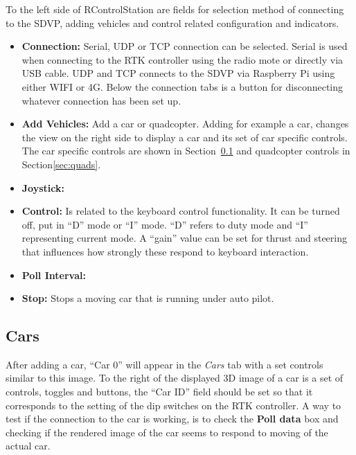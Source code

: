 \documentclass[12pt]{article} %
\begin{document}
\begin{minipage}{0.2\textwidth}
\end{minipage}
\begin{minipage}{0.7\textwidth}
  To the left side of RControlStation are fields for selection method of connecting to the
  SDVP, adding vehicles and control related configuration and indicators.  
  \begin{itemize}
  \item {\bf Connection:} Serial, UDP or TCP connection can be
    selected. Serial is used when connecting to the RTK controller
    using the radio mote or directly via USB cable. UDP and TCP
    connects to the SDVP via Raspberry Pi using either WIFI or 4G.
    Below the connection tabs is a button for disconnecting whatever
    connection has been set up. 
  \item {\bf Add Vehicles:} Add a car or quadcopter. Adding for
    example a car, changes the view on the right side to display a car
    and its set of car specific controls. The car specific controls are
    shown in Section~\ref{sec:cars} and quadcopter controls in Section\ref{sec:quads}.
  \item {\bf Joystick:} 
  \item {\bf Control:} Is related to the keyboard control
    functionality. It can be turned off, put in ``D'' mode or ``I''
    mode. ``D'' refers to duty mode and ``I'' representing current
    mode.  A ``gain'' value can be set for thrust and steering that
    influences how strongly these respond to keyboard interaction.
  \item {\bf Poll Interval:}
  \item {\bf Stop:} Stops a moving car that is running under auto pilot.
  \end{itemize} 
\end{minipage}


\subsection{Cars}
\label{sec:cars}


  After adding a car, ``Car 0'' will appear in the {\em Cars} tab with
  a set controls similar to this image.  To the right of the displayed
  3D image of a car is a set of controls, toggles and buttons, the
  ``Car ID'' field should be set so that it corresponds to the setting
  of the dip switches on the RTK controller. A way to test if the
  connection to the car is working, is to check the {\bf Poll data}
  box and checking if the rendered image of the car seems to respond
  to moving of the actual car.
  
\end{document}
